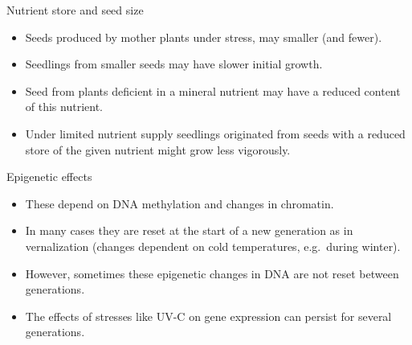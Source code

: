 \documentclass[10pt]{beamer}
\begin{document}
\begin{frame}{Nutrient store and seed size}
    \begin{itemize}
        \item Seeds produced by mother plants under stress, may smaller (and fewer).
        \item Seedlings from smaller seeds may have slower initial growth.
        \item Seed from plants deficient in a mineral nutrient may have a reduced content of this nutrient.
        \item Under limited nutrient supply seedlings originated from seeds with a reduced store of the given nutrient might grow less vigorously.
    \end{itemize}
\end{frame}

\begin{frame}{Epigenetic effects}
    \begin{itemize}
        \item These depend on DNA methylation and changes in chromatin.
        \item In many cases they are reset at the start of a new generation as in vernalization (changes dependent on cold temperatures, e.g.\ during winter).
        \item However, sometimes these epigenetic changes in DNA are not reset between generations.
        \item The effects of stresses like UV-C on gene expression can persist for several generations.
    \end{itemize}
\end{frame}
\end{document}
